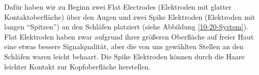 \documentclass[11pt]{scrartcl}
\begin{document}
	\begin{figure}[h!]
	\end{figure}

	Dafür haben wir zu Beginn zwei Flat Electrodes (Elektroden mit glatter Kontaktoberfläche) über den Augen und zwei Spike Elektroden (Elektroden mit langen \enquote{Spitzen}) an den Schläfen platziert (siehe Abbildung \ref{10-20-System}). Flat Elektroden haben zwar aufgrund ihrer größeren Oberfläche auf freier Haut eine etwas bessere Signalqualität, aber die von uns gewählten Stellen an den Schläfen waren leicht behaart. Die Spike Elektroden können durch die Haare leichter Kontakt zur Kopfoberfläche herstellen.

	\begin{figure}[h!]
	\end{figure}
\end{document}
